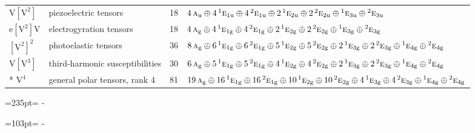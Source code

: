 \documentclass[10pt,a4paper]{article}
\newcommand{\needspace}[1]{\par\penalty-100\begingroup\dimen0=#1\relax\dimen2=\pagegoal
  \advance\dimen2-\pagetotal\ifdim\dimen0>\dimen2\relax\ifdim\dimen2>0pt\vfil\break\fi\fi
  \endgroup}
\numberwithin{equation}{section}
\newcommand{\irr}[1]{\text{\normalfont\scshape #1}}
\newcommand{\conjpair}[1]{{}^{#1}}
\newcommand{\ptag}[1]{\mathrm{#1}}
\newcommand{\jahn}[1]{\mathrm{#1}}
\newlength{\fillwidth}\newlength{\cellwidth}\newlength{\colwidth}
\begin{document}
{\begin{longtable}{@{}llr>{\RaggedRight\arraybackslash}p{\fillwidth}@{}}
$\jahn{V[V^{2}]}$ & piezoelectric tensors & 18 & $4\,\irr{a}_{\ptag{u}} \oplus\allowbreak 4\,\conjpair{1}\irr{e}_{1\ptag{u}} \oplus\allowbreak 4\,\conjpair{2}\irr{e}_{1\ptag{u}} \oplus\allowbreak 2\,\conjpair{1}\irr{e}_{2\ptag{u}} \oplus\allowbreak 2\,\conjpair{2}\irr{e}_{2\ptag{u}} \oplus\allowbreak \conjpair{1}\irr{e}_{3\ptag{u}} \oplus\allowbreak \conjpair{2}\irr{e}_{3\ptag{u}}$\\
$\jahn{e[V^{2}]V}$ & electrogyration tensors & 18 & $4\,\irr{a}_{\ptag{g}} \oplus\allowbreak 4\,\conjpair{1}\irr{e}_{1\ptag{g}} \oplus\allowbreak 4\,\conjpair{2}\irr{e}_{1\ptag{g}} \oplus\allowbreak 2\,\conjpair{1}\irr{e}_{2\ptag{g}} \oplus\allowbreak 2\,\conjpair{2}\irr{e}_{2\ptag{g}} \oplus\allowbreak \conjpair{1}\irr{e}_{3\ptag{g}} \oplus\allowbreak \conjpair{2}\irr{e}_{3\ptag{g}}$\\
$\jahn{[V^{2}]^{2}}$ & photoelastic tensors & 36 & $8\,\irr{a}_{\ptag{g}} \oplus\allowbreak 6\,\conjpair{1}\irr{e}_{1\ptag{g}} \oplus\allowbreak 6\,\conjpair{2}\irr{e}_{1\ptag{g}} \oplus\allowbreak 5\,\conjpair{1}\irr{e}_{2\ptag{g}} \oplus\allowbreak 5\,\conjpair{2}\irr{e}_{2\ptag{g}} \oplus\allowbreak 2\,\conjpair{1}\irr{e}_{3\ptag{g}} \oplus\allowbreak 2\,\conjpair{2}\irr{e}_{3\ptag{g}} \oplus\allowbreak \conjpair{1}\irr{e}_{4\ptag{g}} \oplus\allowbreak \conjpair{2}\irr{e}_{4\ptag{g}}$\\
$\jahn{V[V^{3}]}$ & third-harmonic susceptibilities & 30 & $6\,\irr{a}_{\ptag{g}} \oplus\allowbreak 5\,\conjpair{1}\irr{e}_{1\ptag{g}} \oplus\allowbreak 5\,\conjpair{2}\irr{e}_{1\ptag{g}} \oplus\allowbreak 4\,\conjpair{1}\irr{e}_{2\ptag{g}} \oplus\allowbreak 4\,\conjpair{2}\irr{e}_{2\ptag{g}} \oplus\allowbreak 2\,\conjpair{1}\irr{e}_{3\ptag{g}} \oplus\allowbreak 2\,\conjpair{2}\irr{e}_{3\ptag{g}} \oplus\allowbreak \conjpair{1}\irr{e}_{4\ptag{g}} \oplus\allowbreak \conjpair{2}\irr{e}_{4\ptag{g}}$\\*
$\jahn{V^{4}}$ & general polar tensors, rank 4 & 81 & $19\,\irr{a}_{\ptag{g}} \oplus\allowbreak 16\,\conjpair{1}\irr{e}_{1\ptag{g}} \oplus\allowbreak 16\,\conjpair{2}\irr{e}_{1\ptag{g}} \oplus\allowbreak 10\,\conjpair{1}\irr{e}_{2\ptag{g}} \oplus\allowbreak 10\,\conjpair{2}\irr{e}_{2\ptag{g}} \oplus\allowbreak 4\,\conjpair{1}\irr{e}_{3\ptag{g}} \oplus\allowbreak 4\,\conjpair{2}\irr{e}_{3\ptag{g}} \oplus\allowbreak \conjpair{1}\irr{e}_{4\ptag{g}} \oplus\allowbreak \conjpair{2}\irr{e}_{4\ptag{g}}$\\
\bottomrule\end{longtable}}
\needspace{235pt}
\needspace{103pt}
\end{document}
